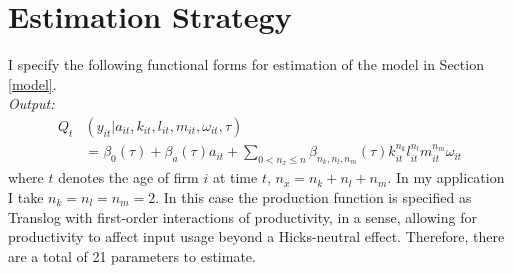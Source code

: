 \documentclass{article}
\begin{document}

\section{Estimation Strategy} \label{estimation}

I specify the following functional forms for estimation of the model in Section \ref{model}.\\

\noindent \textit{Output:}\\
\begin{equation}\label{ymodel}
\begin{split}
Q_{t}&(y_{it}|a_{it}, k_{it}, l_{it}, m_{it}, \omega_{it}, \tau)\\
&=\beta_{0}(\tau)+\beta_{a}(\tau)a_{it}+\sum_{0<n_{x}\leq n}\beta_{n_{k}, n_{l}, n_{m}}(\tau)k_{it}^{n_{k}}l^{n_{l}}_{it}m^{n_{m}}_{it}\omega_{it}
\end{split}
\end{equation}
where $t$ denotes the age of firm $i$ at time $t$, $n_{x}=n_{k}+n_{l}+n_{m}$. In my application I take $n_{k}=n_{l}=n_{m}=2$. In this case the production function is specified as Translog with first-order interactions of productivity, in a sense, allowing for productivity to affect input usage beyond a Hicks-neutral effect. Therefore, there are a total of 21 parameters to estimate.\\
\end{document}
